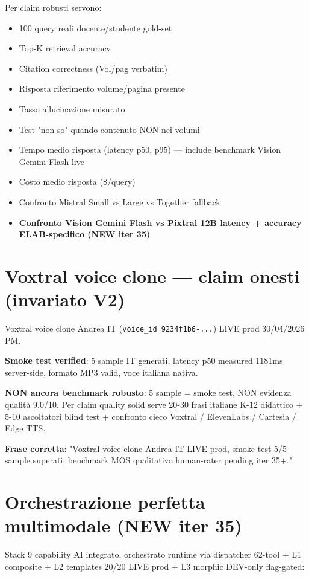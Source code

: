 \documentclass[12pt,a4paper]{article}
\begin{document}
Per claim robusti servono:
\begin{itemize}[leftmargin=*]
  \item 100 query reali docente/studente gold-set
  \item Top-K retrieval accuracy
  \item Citation correctness (Vol/pag verbatim)
  \item Risposta riferimento volume/pagina presente
  \item Tasso allucinazione misurato
  \item Test "non so" quando contenuto NON nei volumi
  \item Tempo medio risposta (latency p50, p95) --- include benchmark Vision Gemini Flash live
  \item Costo medio risposta (\$/query)
  \item Confronto Mistral Small vs Large vs Together fallback
  \item \textbf{Confronto Vision Gemini Flash vs Pixtral 12B latency + accuracy ELAB-specifico (NEW iter 35)}
\end{itemize}

\section{Voxtral voice clone --- claim onesti (invariato V2)}

Voxtral voice clone Andrea IT (\texttt{voice\_id 9234f1b6-...}) LIVE prod 30/04/2026 PM.

\textbf{Smoke test verified}: 5 sample IT generati, latency p50 measured 1181ms server-side, formato MP3 valid, voce italiana nativa.

\textbf{NON ancora benchmark robusto}: 5 sample = smoke test, NON evidenza qualità 9.0/10. Per claim quality solid serve 20-30 frasi italiane K-12 didattico + 5-10 ascoltatori blind test + confronto cieco Voxtral / ElevenLabs / Cartesia / Edge TTS.

\textbf{Frase corretta}: "Voxtral voice clone Andrea IT LIVE prod, smoke test 5/5 sample superati; benchmark MOS qualitativo human-rater pending iter 35+."

\section{Orchestrazione perfetta multimodale (NEW iter 35)}

Stack 9 capability AI integrato, orchestrato runtime via dispatcher 62-tool + L1 composite + L2 templates 20/20 LIVE prod + L3 morphic DEV-only flag-gated:
\end{document}
